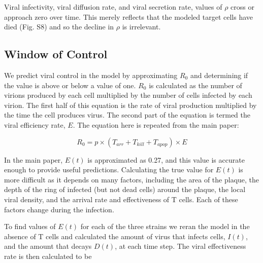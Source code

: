 \documentclass[preprint,10pt,authoryear]{article}
\begin{document}
Viral infectivity, viral diffusion rate, and viral secretion rate, values of $\rho$ cross or approach zero over time.  This merely reflects that the modeled target cells have died (Fig. S8) and so the decline in $\rho$ is irrelevant.


\subsection{Window of Control}

We predict viral control in the model by approximating $R_0$ and determining if the value is above or below a value of one.  $R_0$ is calculated as the number of virions produced by each cell multiplied by the number of cells infected by each virion.  The first half of this equation is the rate of viral production multiplied by the time the cell produces virus.  The second part of the equation is termed the viral efficiency rate, $E$.  The equation here is repeated from the main paper:

\begin{equation}
R_0 = p \times (T_{arr} + T_{kill} + T_{apop}) \times E
\end{equation}

In the main paper, $E(t)$ is approximated as 0.27, and this value is accurate enough to provide useful predictions.  Calculating the true value for $E(t)$ is more difficult as it depends on many factors, including the area of the plaque, the depth of the ring of infected (but not dead cells) around the plaque, the local viral density, and the arrival rate and effectiveness of T cells.  Each of these factors change during the infection. 

To find values of $E(t)$ for each of the three strains we reran the model in the absence of T cells and calculated the amount of virus that infects cells, $I(t)$, and the amount that decays $D(t)$, at each time step.  The viral effectiveness rate is then calculated to be
\end{document}
